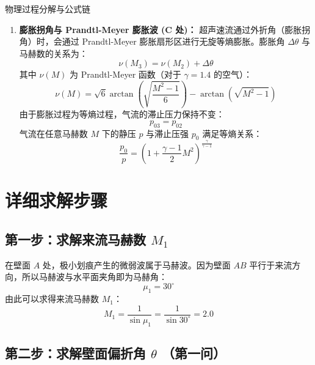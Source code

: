 \documentclass[a4paper,11pt]{article}
\begin{document}
\begin{keypointbox}{物理过程分解与公式链}
\begin{enumerate}
    \item \textbf{膨胀拐角与 Prandtl-Meyer 膨胀波 (C 处)：}
    超声速流通过外折角（膨胀拐角）时，会通过 Prandtl-Meyer 膨胀扇形区进行无旋等熵膨胀。膨胀角 $\Delta \theta$ 与马赫数的关系为：
    \begin{equation}
        \nu(M_3) = \nu(M_2) + \Delta \theta
    \end{equation}
    其中 $\nu(M)$ 为 Prandtl-Meyer 函数（对于 $\gamma = 1.4$ 的空气）：
    \begin{equation}
        \nu(M) = \sqrt{6} \arctan \left( \sqrt{\frac{M^2-1}{6}} \right) - \arctan \left( \sqrt{M^2-1} \right)
    \end{equation}
    由于膨胀过程为等熵过程，气流的滞止压力保持不变：
    \begin{equation}
        p_{03} = p_{02}
    \end{equation}
    气流在任意马赫数 $M$ 下的静压 $p$ 与滞止压强 $p_0$ 满足等熵关系：
    \begin{equation}
        \frac{p_0}{p} = \left( 1 + \frac{\gamma-1}{2} M^2 \right)^{\frac{\gamma}{\gamma-1}}
    \end{equation}
\end{enumerate}
\end{keypointbox}

\section{详细求解步骤}

\subsection{第一步：求解来流马赫数 $M_1$}

在壁面 $A$ 处，极小划痕产生的微弱波属于马赫波。因为壁面 $AB$ 平行于来流方向，所以马赫波与水平面夹角即为马赫角：
\[
\mu_1 = 30^\circ
\]
由此可以求得来流马赫数 $M_1$：
\begin{equation}
    M_1 = \frac{1}{\sin \mu_1} = \frac{1}{\sin 30^\circ} = 2.0
\end{equation}

\subsection{第二步：求解壁面偏折角 $\theta$ （第一问）}
\end{document}
